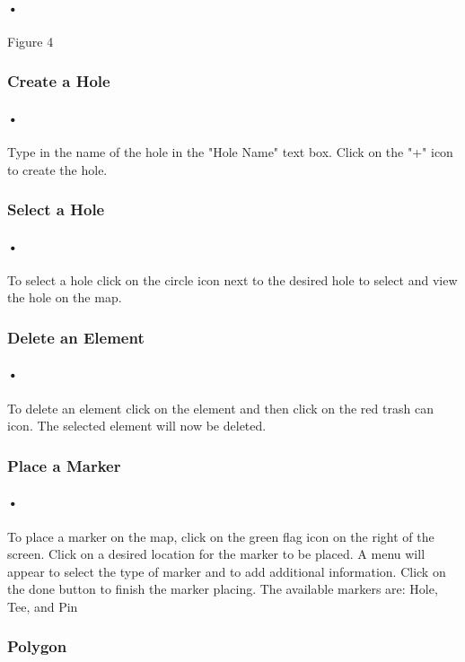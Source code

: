\documentclass{article}
\begin{document}
    \paragraph{•}
    Figure 4
    
    \subsubsection{Create a Hole}
    \paragraph{•}
    Type in the name of the hole in the "Hole Name" text box. Click on the "+" icon to create the hole.
    
    \subsubsection{Select a Hole}
    \paragraph{•}
    To select a hole click on the circle icon next to the desired hole to select and view the hole on the map.
    
    \subsubsection{Delete an Element}
    \paragraph{•}
    To delete an element click on the element and then click on the red trash can icon. The selected element will now be deleted.
    
    \subsubsection{Place a Marker}
	\paragraph{•}
	To place a marker on the map, click on the green flag icon on the right of the screen. Click on a desired location for the marker to be placed. A menu will appear to select the type of marker and to add additional information. Click on the done button to finish the marker placing. The available markers are: Hole, Tee, and Pin
	
	\subsubsection{Polygon}
\end{document}
